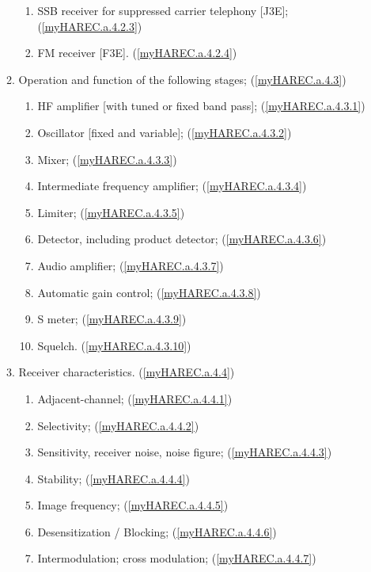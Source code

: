\begin{enumerate}
\begin{enumerate}[noitemsep]
\begin{enumerate}[noitemsep]
\item SSB receiver for suppressed carrier telephony [J3E]; (\ref{myHAREC.a.4.2.3})\label{HAREC.a.4.2.3}
\item FM receiver [F3E]. (\ref{myHAREC.a.4.2.4})\label{HAREC.a.4.2.4}
\end{enumerate}
\item Operation and function of the following stages; (\ref{myHAREC.a.4.3})\label{HAREC.a.4.3}
\begin{enumerate}[noitemsep]
\item HF amplifier [with tuned or fixed band pass]; (\ref{myHAREC.a.4.3.1})\label{HAREC.a.4.3.1}
\item Oscillator [fixed and variable]; (\ref{myHAREC.a.4.3.2})\label{HAREC.a.4.3.2}
\item Mixer; (\ref{myHAREC.a.4.3.3})\label{HAREC.a.4.3.3}
\item Intermediate frequency amplifier; (\ref{myHAREC.a.4.3.4})\label{HAREC.a.4.3.4}
\item Limiter; (\ref{myHAREC.a.4.3.5})\label{HAREC.a.4.3.5}
\item Detector, including product detector; (\ref{myHAREC.a.4.3.6})\label{HAREC.a.4.3.6}
\item Audio amplifier; (\ref{myHAREC.a.4.3.7})\label{HAREC.a.4.3.7}
\item Automatic gain control; (\ref{myHAREC.a.4.3.8})\label{HAREC.a.4.3.8}
\item S meter; (\ref{myHAREC.a.4.3.9})\label{HAREC.a.4.3.9}
\item Squelch. (\ref{myHAREC.a.4.3.10})\label{HAREC.a.4.3.10}
\end{enumerate}
\item Receiver characteristics. (\ref{myHAREC.a.4.4})\label{HAREC.a.4.4}
\begin{enumerate}[noitemsep]
\item Adjacent-channel; (\ref{myHAREC.a.4.4.1})\label{HAREC.a.4.4.1}
\item Selectivity; (\ref{myHAREC.a.4.4.2})\label{HAREC.a.4.4.2}
\item Sensitivity, receiver noise, noise figure; (\ref{myHAREC.a.4.4.3})\label{HAREC.a.4.4.3}
\item Stability; (\ref{myHAREC.a.4.4.4})\label{HAREC.a.4.4.4}
\item Image frequency; (\ref{myHAREC.a.4.4.5})\label{HAREC.a.4.4.5}
\item Desensitization / Blocking; (\ref{myHAREC.a.4.4.6})\label{HAREC.a.4.4.6}
\item Intermodulation; cross modulation; (\ref{myHAREC.a.4.4.7})\label{HAREC.a.4.4.7}

\end{enumerate}
\end{enumerate}
\end{enumerate}
